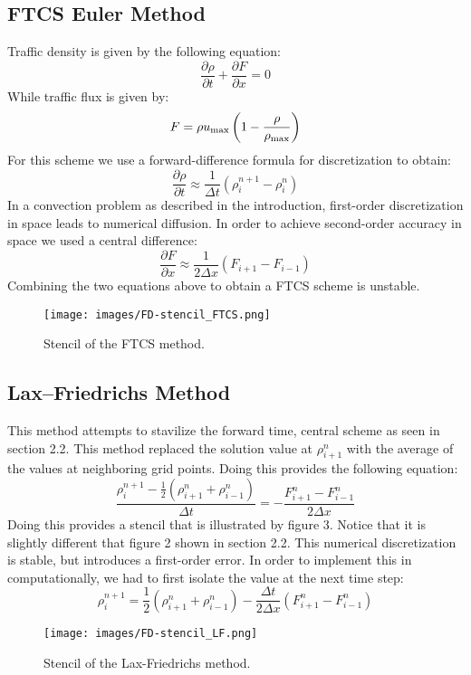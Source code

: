 \documentclass{article}
\begin{document}
\subsection{FTCS Euler Method}
Traffic density is given by the following equation:
\begin{equation} \frac{\partial \rho}{\partial t} + \frac{\partial F}{\partial x} = 0 \end{equation}
While traffic flux is given by:
\begin{equation} F = \rho u_{\rm max} \left(1-\frac{\rho}{\rho_{\rm max}}\right)
\end{equation}
For this scheme we use a forward-difference formula for discretization to obtain:
\begin{equation}\frac{\partial \rho}{\partial t}\approx \frac{1}{\Delta t}( \rho_i^{n+1}-\rho_i^n )\end{equation}
In a convection problem as described in the introduction, first-order discretization in space leads to numerical diffusion. In order to achieve second-order accuracy in space we used a central difference:
\begin{equation}\frac{\partial F}{\partial x} \approx \frac{1}{2\Delta x}( F_{i+1}-F_{i-1})\end{equation}
Combining the two equations above  to obtain a FTCS scheme is unstable. 
\begin{figure}[H]
\begin{center}
\texttt{[image: images/FD-stencil\_FTCS.png]}
\caption{Stencil of the FTCS method.}
\end{center}
\end{figure}
\subsection{Lax–Friedrichs Method}
This method attempts to stavilize the forward time, central scheme as seen in section 2.2. This method replaced the solution value at $\rho^n_{i+1}$ with the average of the values at neighboring grid points. Doing this provides the following equation: 
\begin{equation}\frac{\rho_i^{n+1}-\frac{1}{2}(\rho^n_{i+1}+\rho^n_{i-1})}{\Delta t} = -\frac{F^n_{i+1}-F^n_{i-1}}{2 \Delta x}\end{equation}
Doing this provides a stencil that is illustrated by figure 3. Notice that it is slightly different that figure 2 shown in section 2.2. This numerical discretization is stable, but introduces a first-order error.
In order to implement this in computationally, we had to first isolate the value at the next time step:
\begin{equation}\rho_i^{n+1} = \frac{1}{2}(\rho^n_{i+1}+\rho^n_{i-1}) - \frac{\Delta t}{2 \Delta x}(F^n_{i+1}-F^n_{i-1})\end{equation}
\begin{figure}[H]
\begin{center}
\texttt{[image: images/FD-stencil\_LF.png]}
\caption{Stencil of the Lax-Friedrichs method.}
\end{center}
\end{figure}
\end{document}
